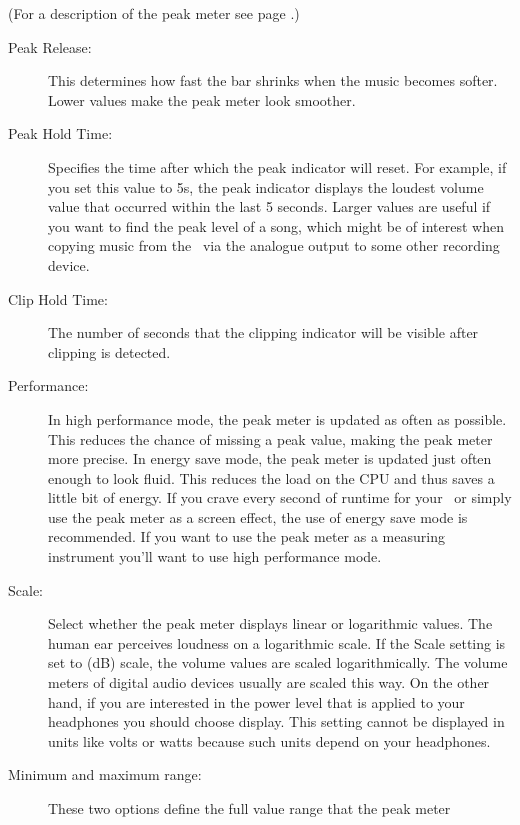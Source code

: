 \begin{description}
{      (For a description of the peak meter see page \pageref{sec:peakmeter}.)
      \begin{description}
      \item[Peak Release:]
        This determines how fast the bar shrinks when the music becomes
        softer. Lower values make the peak meter look smoother.
      \item[Peak Hold Time:]
        Specifies the time after which the peak indicator will reset.
        For example, if you set this value to 5s, the peak indicator displays
        the loudest volume value that occurred within the last 5 seconds.
        Larger values are useful if you want to find the peak level of a song,
        which might be of interest when copying music from the \dap\ via the
        analogue output to some other recording device.
      \item[Clip Hold Time:]
        The number of seconds that the clipping indicator will be visible
        after clipping is detected.
      \item[Performance:]
        In high performance mode, the peak meter is updated as often as
        possible. This reduces the chance of missing a peak value, making
        the peak meter more precise. In energy save mode, the peak meter is
        updated just often enough to look fluid.  This reduces the load on
        the CPU and thus saves a little bit of energy.  If you crave every
        second of runtime for your \dap\ or simply use the peak meter as a
        screen effect, the use of energy save mode is recommended.  If you
        want to use the peak meter as a measuring instrument you'll want to
        use high performance mode.
      \item[Scale:]
        Select whether the peak meter displays linear or logarithmic values.
        The human ear perceives loudness on a logarithmic scale. If the Scale
        setting is set to  (dB) scale, the volume values
        are scaled logarithmically. The volume meters of digital audio
        devices usually are scaled this way. On the other hand, if you
        are interested in the power level that is applied to your headphones
        you should choose  display. This setting cannot be
        displayed in units like volts or watts because such units depend
        on your headphones.
      \item[Minimum and maximum range:]
        These two options define the full value range that the peak meter

\end{description}}
\end{description}
